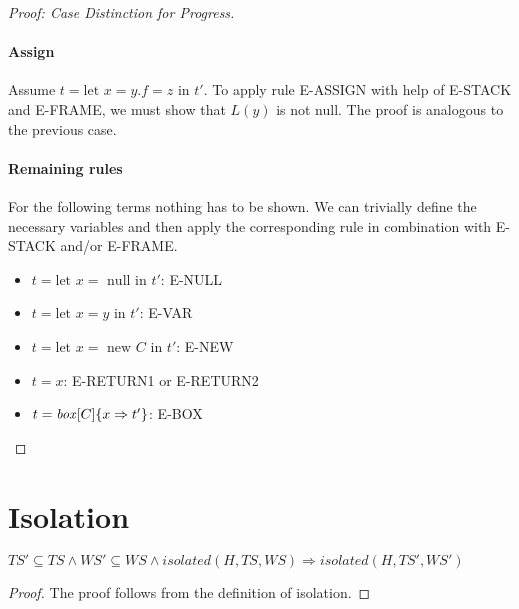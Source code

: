 \begin{proof}[Proof: Case Distinction for Progress]
\paragraph{Assign}
Assume $t = \text{let } x = y.f = z \text{ in } t'$. To apply rule E-ASSIGN with help of E-STACK and E-FRAME, we must show that $L(y)$ is not null. The proof is analogous to the previous case.

\paragraph{Remaining rules}
For the following terms nothing has to be shown. We can trivially define the necessary variables and then apply the corresponding rule in combination with E-STACK and/or E-FRAME.
\begin{itemize}
    \item $t = \text{let } x = \text{ null in } t'$: E-NULL
    \item $t = \text{let } x = y \text{ in } t'$: E-VAR
    \item $t = \text{let } x = \text{ new } C \text{ in } t'$: E-NEW
    \item $t = x$: E-RETURN1 or E-RETURN2
    \item $t = \mathop{\mathit{box}}[C]\{ x \Rightarrow t' \}$: E-BOX
\end{itemize}
\end{proof} %


\section{Isolation}



\begin{lemma} \label{iso-subset}
    $TS' \subseteq TS \wedge WS' \subseteq WS \wedge isolated(H,TS,WS) \Rightarrow isolated(H, TS', WS')$
\end{lemma}
\begin{proof}
The proof follows from the definition of isolation.
\end{proof}

